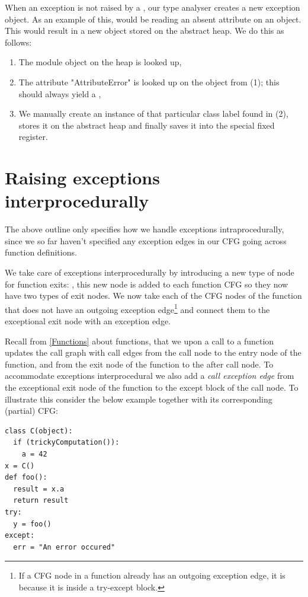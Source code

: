 When an exception is not raised by a , our type analyser creates a new exception object. As an example of this, would be reading an absent attribute on an object. This would result in a new  object stored on the abstract heap. We do this as follows:

\begin{enumerate}
	\item The  module object on the heap is looked up,
	\item The attribute "AttributeError" is looked up on the  object from (1); this should always yield a ,
	\item We manually create an instance of that particular class label found in (2), stores it on the abstract heap and finally saves it into the special fixed register.
\end{enumerate}


\section{Raising exceptions interprocedurally}
The above outline only specifies how we handle exceptions intraprocedurally, since we so far haven't specified any exception edges in our CFG going across function definitions.

We take care of exceptions interprocedurally by introducing a new type of node for function exits: , this new node is added to each function CFG so they now have two types of exit nodes. We now take each of the CFG nodes of the function that does not have an outgoing exception edge\footnote{If a CFG node in a function already has an outgoing exception edge, it is because it is inside a try-except block.} and connect them to the exceptional exit node with an exception edge.

Recall from \autoref{Functions} about functions, that we upon a call to a function updates the call graph with call edges from the call node to the entry node of the function, and from the exit node of the function to the after call node. To accommodate exceptions interprocedural we also add a \textit{call exception edge} from the exceptional exit node of the function to the except block of the call node. To illustrate this consider the below example together with its corresponding (partial) CFG:

\begin{listing}[H]
	\begin{verbatim}
class C(object):
  if (trickyComputation()):
    a = 42
x = C()
def foo():
  result = x.a
  return result
try:
  y = foo()
except:
  err = "An error occured"
	\end{verbatim}
\end{listing}

